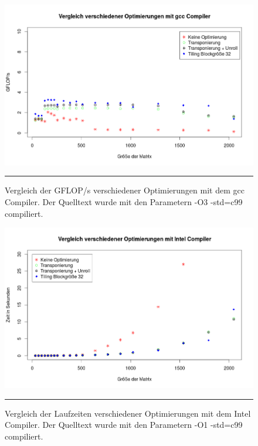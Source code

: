 \begin{figure}[h]
\includegraphics[scale = 0.45]{Bilder/GgccO3.png}
\caption{Vergleich der GFLOP/s verschiedener Optimierungen mit dem gcc Compiler. Der Quelltext wurde mit den Parametern -O3 -std=c99 compiliert.}
\noindent\rule{14cm}{0.4pt}
\label{GgccO3}
\end{figure}

\begin{figure}[h]
\includegraphics[scale = 0.45]{Bilder/iccO1.png}
\caption{Vergleich der Laufzeiten verschiedener Optimierungen mit dem Intel Compiler. Der Quelltext wurde mit den Parametern -O1 -std=c99 compiliert.}
\noindent\rule{14cm}{0.4pt}
\label{iccO1}
\end{figure}

